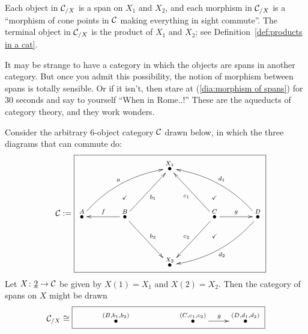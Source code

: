 \documentclass[CT4S-EN-RU]{subfiles}
\begin{document}
\begin{constructionENG}[Products]
Each object in $\mathcal{C}_{/X}$ is a span on $X_1$ and $X_2$, and each morphism in $\mathcal{C}_{/X}$ is a “morphism of cone points in $\mathcal{C}$ making everything in sight commute”. The terminal object in $\mathcal{C}_{/X}$ is the product of $X_1$ and $X_2$; see Definition~\ref{def:products in a cat}.
\end{constructionENG}

\begin{constructionRUS}[Products]
\end{constructionRUS}

\begin{blockENG}
It may be strange to have a category in which the objects are spans in another category. But once you admit this possibility, the notion of morphism between spans is totally sensible. Or if it isn't, then stare at (\ref{dia:morphism of spans}) for 30 seconds and say to yourself “When in Rome..!” These are the aqueducts of category theory, and they work wonders.
\end{blockENG}

\begin{blockRUS}
\end{blockRUS}

\begin{exampleENG}\label{ex:category of spans}
Consider the arbitrary 6-object category $\mathcal{C}$ drawn below, in which the three diagrams that can commute do:
$$\mcC:=\parbox{3in}{\fbox{\xymatrix@=39pt{&&\LMO{X_1}&\\\LMO{A}\ar@/^1pc/[urr]^a&\LMO{B}\ar[l]_f\ar@{}[u]|(.4){\checkmark}\ar[ur]_{b_1}\ar[dr]^{b_2}&&\LMO{C}\ar@{}[u]|(.4){\checkmark}\ar@{}[d]|(.4){\checkmark}\ar[ul]^{c_1}\ar[dl]_{c_2}\ar[r]^g&\LMO{D}\ar@/_1pc/[llu]_{d_1}\ar@/^1pc/[lld]^{d_2}\\&&\LMO{X_2}&}}}$$
Let $X\colon\underline{2}\rightarrow\mathcal{C}$ be given by $X(1)=X_1$ and $X(2)=X_2$. Then the category of spans on $X$ might be drawn
$$\mcC_{/X}\iso\fbox{\xymatrix{&\LMO{(B,b_1,b_2)}&&\LMO{(C,c_1,c_2)}\ar[r]^g&\LMO{(D,d_1,d_2)}}}$$
\end{exampleENG}

\begin{exampleRUS}\label{ex:category of spans}
\end{exampleRUS}


\subsubsection{}
\end{document}
